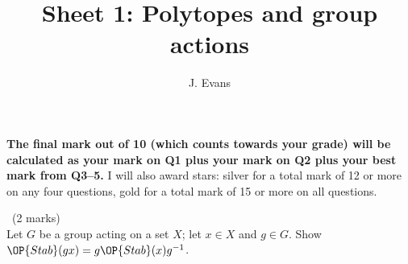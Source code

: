 \documentclass[12pt]{article}
\title{Sheet 1: Polytopes and group actions}
\author{J. Evans}
\date{}
\begin{document}
\maketitle

\bigskip

{\bf The final mark out of 10 (which counts towards your grade) will be calculated as your mark on Q1 plus your mark on Q2 plus your best mark from Q3--5.} I will also award stars: silver for a total mark of 12 or more on any four questions, gold for a total mark of 15 or more on all questions.

\vspace{1cm}

\begin{question}\ (2 marks)\\
Let $G$ be a group acting on a set $X$; let $x\in X$ and $g\in G$. Show $\OP{Stab}(gx)=g\OP{Stab}(x)g^{-1}$.
\end{question}

\iffalse
\begin{answer}
If $h\in\OP{Stab}(x)$ then $ghg^{-1}(gx)=ghx=gx$ so $ghg^{-1}\in\OP{Stab}(gx)$. Conversely, if $h\in\OP{Stab}(gx)$ then let $j=g^{-1}hg$. We have $j(x)=g^{-1}h(gx)=g^{-1}gx=x$ so $j\in\OP{Stab}(x)$. Therefore $h=gjg^{-1}$.
\end{answer}
\newpage
\fi

\vspace{1cm}
\end{document}

